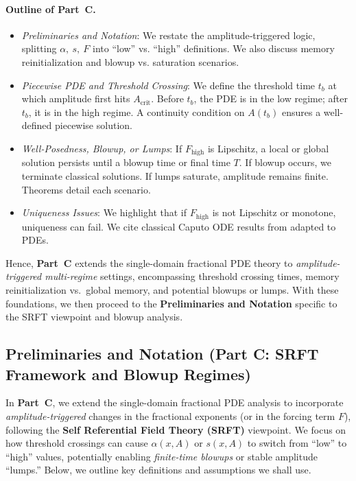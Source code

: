 \documentclass[12pt]{article}
\begin{document}
\paragraph{Outline of Part~C.}
\begin{itemize}
    \item \emph{Preliminaries and Notation}: We restate the amplitude‐triggered logic, splitting $\alpha,\ s,\ F$ into “low” vs. “high” definitions. We also discuss memory reinitialization and blowup vs. saturation scenarios.
    \item \emph{Piecewise PDE and Threshold Crossing}: We define the threshold time $t_b$ at which amplitude first hits $A_{\mathrm{crit}}$. Before $t_b$, the PDE is in the low regime; after $t_b$, it is in the high regime. A continuity condition on $A(t_b)$ ensures a well-defined piecewise solution.
    \item \emph{Well-Posedness, Blowup, or Lumps}: If $F_{\mathrm{high}}$ is Lipschitz, a local or global solution persists until a blowup time or final time $T$. If blowup occurs, we terminate classical solutions. If lumps saturate, amplitude remains finite. Theorems detail each scenario.
    \item \emph{Uniqueness Issues}: We highlight that if $F_{\mathrm{high}}$ is not Lipschitz or monotone, uniqueness can fail. We cite classical Caputo ODE results from \cite[Ch.~7]{Diethelm2010} adapted to PDEs.
\end{itemize}

\noindent
Hence, \textbf{Part~C} extends the single-domain fractional PDE theory to \emph{amplitude-triggered multi-regime} settings, encompassing threshold crossing times, memory reinitialization vs.\ global memory, and potential blowups or lumps. With these foundations, we then proceed to the \textbf{Preliminaries and Notation} specific to the SRFT viewpoint and blowup analysis.

\subsection{Preliminaries and Notation (Part C: SRFT Framework and Blowup Regimes)}
\label{subsec:prelim_partC}

In \textbf{Part~C}, we extend the single-domain fractional PDE analysis to incorporate
\emph{amplitude-triggered} changes in the fractional exponents (or in the forcing term
\(F\)), following the \textbf{Self Referential Field Theory (SRFT)} viewpoint.
We focus on how threshold crossings can cause \(\alpha(x,A)\) or \(s(x,A)\) to switch
from “low” to “high” values, potentially enabling \emph{finite-time blowups} or stable
amplitude “lumps.” Below, we outline key definitions and assumptions we shall use.
\end{document}
